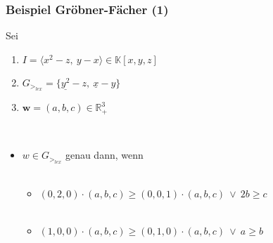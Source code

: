 \documentclass{beamer}
\begin{document}
\begin{frame}[fragile]
\frametitle{Beispiel Gröbner-Fächer (1)}
 Sei 
 \begin{enumerate}
 \item $I = \langle x^{2}-z,~y-x  \rangle \in \mathbb{K}\left[x,y,z\right]  $
 \item $G_{>_{lex}} = \{ \underline{y^{2}}-z,~\underline{x}-y  \} $ 
 \item $\textbf{w}= (a,b,c) \in \mathbb{R}^{3}_{+} $
\end{enumerate}
 
~\\
\begin{itemize}
\item $w \in G_{>_{lex}}$ genau dann, wenn 
~\\
~\\
\begin{itemize}
\item $ \left(0,2,0\right) \cdot \left(a,b,c\right) \geq \left(0,0,1\right) \cdot  \left(a,b,c\right) ~ \vee ~ 2b \geq c  $
~\\
~\\
\item
$ \left(1,0,0\right) \cdot \left(a,b,c\right) \geq \left(0,1,0\right) \cdot  \left(a,b,c\right) ~ \vee ~ a \geq b  $
\end{itemize}
\end{itemize}

\end{frame}
\end{document}
